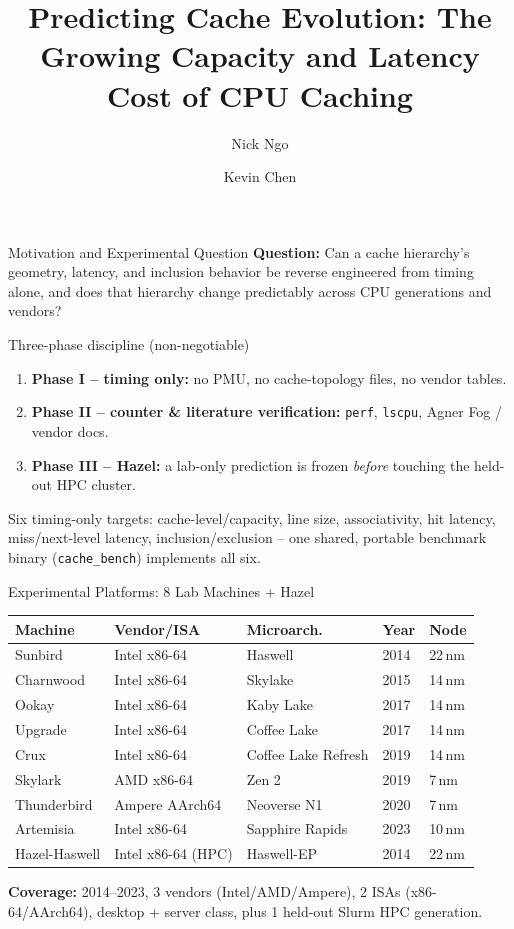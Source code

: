\documentclass[aspectratio=169,10pt]{beamer}
\title[Cache Reverse Engineering]{Predicting Cache Evolution: The Growing Capacity and Latency Cost of CPU Caching}
\author{Nick Ngo \and Kevin Chen}
\institute{ECE 592 -- Fall 2026}
\date{}
\begin{document}
\begin{frame}
\titlepage
\end{frame}

\begin{frame}{Motivation and Experimental Question}
\textbf{Question:} Can a cache hierarchy's geometry, latency, and inclusion behavior be
reverse engineered from timing alone, and does that hierarchy change predictably across
CPU generations and vendors?

\medskip
\begin{block}{Three-phase discipline (non-negotiable)}
\begin{enumerate}
    \item \textbf{Phase I -- timing only:} no PMU, no cache-topology files, no vendor tables.
    \item \textbf{Phase II -- counter \& literature verification:} \texttt{perf}, \texttt{lscpu}, Agner Fog / vendor docs.
    \item \textbf{Phase III -- Hazel:} a lab-only prediction is frozen \emph{before} touching the held-out HPC cluster.
\end{enumerate}
\end{block}

\medskip
Six timing-only targets: cache-level/capacity, line size, associativity, hit latency,
miss/next-level latency, inclusion/exclusion -- one shared, portable benchmark binary
(\texttt{cache\_bench}) implements all six.
\end{frame}

\begin{frame}{Experimental Platforms: 8 Lab Machines + Hazel}
\centering\scriptsize
\begin{tabular}{lllll}
\toprule
Machine & Vendor/ISA & Microarch. & Year & Node \\
\midrule
Sunbird & Intel x86-64 & Haswell & 2014 & 22\,nm \\
Charnwood & Intel x86-64 & Skylake & 2015 & 14\,nm \\
Ookay & Intel x86-64 & Kaby Lake & 2017 & 14\,nm \\
Upgrade & Intel x86-64 & Coffee Lake & 2017 & 14\,nm \\
Crux & Intel x86-64 & Coffee Lake Refresh & 2019 & 14\,nm \\
Skylark & AMD x86-64 & Zen 2 & 2019 & 7\,nm \\
Thunderbird & Ampere AArch64 & Neoverse N1 & 2020 & 7\,nm \\
Artemisia & Intel x86-64 & Sapphire Rapids & 2023 & 10\,nm \\
\midrule
Hazel-Haswell & Intel x86-64 (HPC) & Haswell-EP & 2014 & 22\,nm \\
\bottomrule
\end{tabular}

\vspace{4mm}
\textbf{Coverage:} 2014--2023, 3 vendors (Intel/AMD/Ampere), 2 ISAs (x86-64/AArch64),
desktop + server class, plus 1 held-out Slurm HPC generation.
\end{frame}
\end{document}
